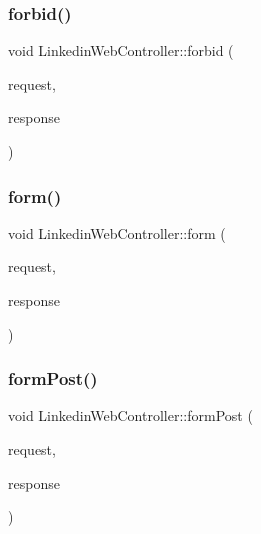 \mbox{\label{classLinkedinWebController_a44ae4397ca88552b07b6bc8e57c713fc}} 
\subsubsection{\texorpdfstring{forbid()}{forbid()}}
{\footnotesize\ttfamily void Linkedin\+Web\+Controller\+::forbid (\begin{DoxyParamCaption}\item[{Mongoose\+::\+Request \&}]{request,  }\item[{Mongoose\+::\+Stream\+Response \&}]{response }\end{DoxyParamCaption})}

\mbox{\label{classLinkedinWebController_a56c448409227ffb804019899ff5d4488}} 
\subsubsection{\texorpdfstring{form()}{form()}}
{\footnotesize\ttfamily void Linkedin\+Web\+Controller\+::form (\begin{DoxyParamCaption}\item[{Mongoose\+::\+Request \&}]{request,  }\item[{Mongoose\+::\+Stream\+Response \&}]{response }\end{DoxyParamCaption})}

\mbox{\label{classLinkedinWebController_a20cc880e30969f5626f6553c6182a78f}} 
\subsubsection{\texorpdfstring{form\+Post()}{formPost()}}
{\footnotesize\ttfamily void Linkedin\+Web\+Controller\+::form\+Post (\begin{DoxyParamCaption}\item[{Mongoose\+::\+Request \&}]{request,  }\item[{Mongoose\+::\+Stream\+Response \&}]{response }\end{DoxyParamCaption})}

